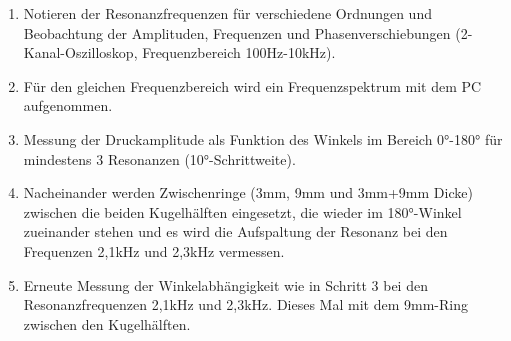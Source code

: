 \begin{enumerate}
\item Notieren der Resonanzfrequenzen für verschiedene Ordnungen und Beobachtung der Amplituden, Frequenzen und
Phasenverschiebungen (2-Kanal-Oszilloskop, Frequenzbereich 100Hz-10kHz).
\item Für den gleichen Frequenzbereich wird ein Frequenzspektrum mit dem PC aufgenommen.
\item Messung der Druckamplitude als Funktion des Winkels im Bereich 0°-180° für mindestens 3 Resonanzen (10°-Schrittweite).
\item Nacheinander werden Zwischenringe (3mm, 9mm und 3mm+9mm Dicke) zwischen die beiden Kugelhälften eingesetzt, die wieder im
180°-Winkel zueinander stehen und es wird die Aufspaltung der Resonanz bei den Frequenzen 2,1kHz und 2,3kHz vermessen.
\item Erneute Messung der Winkelabhängigkeit wie in Schritt 3 bei den Resonanzfrequenzen 2,1kHz und 2,3kHz. Dieses Mal mit
dem 9mm-Ring zwischen den Kugelhälften.
\end{enumerate}
